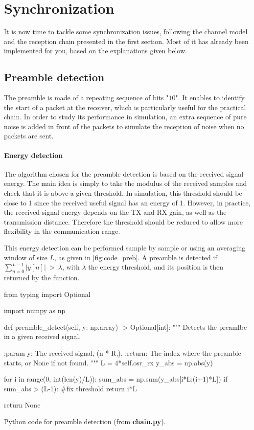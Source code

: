 \section{Synchronization}
It is now time to tackle some synchronization issues, following the channel model and the reception chain presented in the first section. Most of it has already been implemented for you, based on the explanations given below.

\subsection{Preamble detection}
The preamble is made of a repeating sequence of bits "$10$". It enables to identify the start of a packet at the receiver, which is particularly useful for the practical chain. In order to study its performance in simulation, an extra sequence of pure noise is added in front of the packets to simulate the reception of noise when no packets are sent.

\paragraph{Energy detection} The algorithm chosen for the preamble detection is based on the received signal energy. The main idea is simply to take the modulus of the received samples and check that it is above a given threshold. In simulation, this threshold should be close to 1 since the received useful signal has an energy of 1. However, in practice, the received signal energy depends on the TX and RX gain, as well as the transmission distance. Therefore the threshold should be reduced to allow more flexibility in the communication range.

This energy detection can be performed sample by sample or using an averaging window of size $L$, as given in \autoref{fig:code_preb}. A preamble is detected if $\sum_{n=0}^{L-1}|y[n]| \: > \: \lambda$,
with $\lambda$ the energy threshold, and its position is then returned by the function.

\begin{listing}[H]
\begin{python}
from typing import Optional

import numpy as np

def preamble_detect(self, y: np.array) -> Optional[int]:
    """
    Detects the preamlbe in a given received signal.

    :param y: The received signal, (n * R,).
    :return: The index where the preamble starts,
        or None if not found.
    """
    L = 4*self.osr_rx
    y_abs = np.abs(y)

    for i in range(0, int(len(y)/L)):
        sum_abs = np.sum(y_abs[i*L:(i+1)*L])
        if sum_abs > (L-1): #fix threshold
            return i*L

    return None

\end{python}
\caption{Python code for preamble detection (from \textbf{chain.py}).}
\label{fig:code_preb}
\end{listing}

